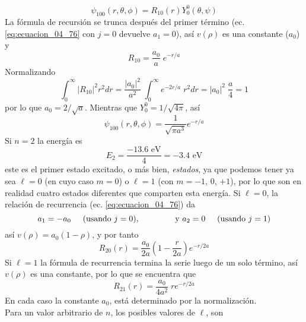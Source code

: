 \begin{equation}
\psi_{100} (r, \theta, \phi) = R_{10}(r) Y_{0}^{0} (\theta, \psi)
\label{eq:ecuacion_04_78}
\end{equation}
La fórmula de recursión se trunca después del primer término (ec. \ref{eq:ecuacion_04_76} con $j=0$ devuelve $a_{1} = 0$), así $v(\rho)$ es una constante ($a_{0}$) y
\begin{equation}
R_{10} = \dfrac{a_{0}}{a} \; e^{-r/a}
\label{eq:ecuacion_04_79}
\end{equation}
Normalizando
\[ \int_{0}^{\infty} \vert R_{10} \vert^{2} r^{2} dr = \dfrac{\vert a_{0} \vert^{2}}{a^{2}} \; \int_{0}^{\infty} e^{-2r/a} \; r^{2} dr =  \vert a_{0} \vert^{2} \; \dfrac{a}{4} =  1 \]
por lo que $a_{0} = 2 / \sqrt{a}$. Mientras que $Y_{0}^{0} = 1 / \sqrt{4 \pi}$, así
\begin{equation}
\boxed{\psi_{100} (r, \theta, \phi) = \dfrac{1}{\sqrt{\pi a^{3}}} e^{-r/a}}
\label{eq:ecuacion_04_80}
\end{equation}
Si $n = 2$ la energía es
\begin{equation}
E_{2} = \dfrac{-13.6 \text{ eV}}{4} =  - 3.4 \text{ eV}
\label{eq:ecuacion_04_81}
\end{equation}
este es el primer estado excitado, o más bien, \textit{estados}, ya que podemos tener ya sea $\ell = 0$ (en cuyo caso $m = 0$) o $\ell = 1$ (con $m = -1$, $0$, $+ 1$), por lo que son en realidad cuatro estados diferentes que comparten esta energía. Si $\ell = 0$, la relación de recurrencia (ec. \ref{eq:ecuacion_04_76}) da
\[ a_{1} = - a_{0} \hspace{0.5cm} \text{(usando } j = 0 \text{)}, \hspace{1.5cm} \text{y } a_{2} = 0 \hspace{0.5cm} \text{(usando } j = 1 \text{)} \]
así $v(\rho) = a_{0}(1 - \rho)$, y por tanto
\begin{equation}
R_{20}(r) = \dfrac{a_{0}}{2 a} \left(1 - \dfrac{r}{2 a} \right) e^{-r/2a}
\label{eq:ecuacion_04_82}
\end{equation}
Si $\ell = 1$ la fórmula de recurrencia termina la serie luego de un solo término, así $v(\rho)$ es una constante, por lo que se encuentra que
\begin{equation}
R_{21}(r) = \dfrac{a_{0}}{4 a^{2}} \; r e^{-r/2a}
\label{eq:ecuacion_04_83}
\end{equation}
En cada caso la constante $a_{0}$, está determinado por la normalización.
\\
Para un valor arbitrario de $n$, los posibles valores de $\ell$, son
